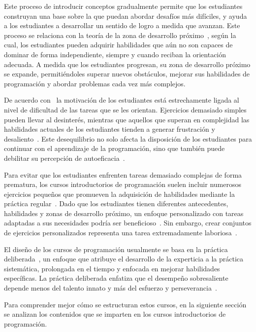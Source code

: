 Este proceso de introducir conceptos gradualmente permite que los estudiantes construyan una base sobre la que puedan abordar desafíos más difíciles, y ayuda a los estudiantes a desarrollar un sentido de logro a medida que avanzan. Este proceso se relaciona con la teoría de la zona de desarrollo próximo~\cite{vygotsky1978mind}, según la cual, los estudiantes pueden adquirir habilidades que aún no son capaces de dominar de forma independiente, siempre y cuando reciban la orientación adecuada. A medida que los estudiantes progresan, su zona de desarrollo próximo se expande, permitiéndoles superar nuevos obstáculos, mejorar sus habilidades de programación y abordar problemas cada vez más complejos.

De acuerdo con~\cite{rosenzweig2019expectancy} la motivación de los estudiantes está estrechamente ligada al nivel de dificultad de las tareas que se les orientan. Ejercicios demasiado simples pueden llevar al desinterés, mientras que aquellos que superan en complejidad las habilidades actuales de los estudiantes tienden a generar frustración y desaliento~\cite{rosenzweig2019expectancy}. Este desequilibrio no solo afecta la disposición de los estudiantes para continuar con el aprendizaje de la programación, sino que también puede debilitar su percepción de autoeficacia~\cite{bandura1977self}.

Para evitar que los estudiantes enfrenten tareas demasiado complejas de forma prematura, los cursos introductorios de programación suelen incluir numerosos ejercicios pequeños que promueven la adquisición de habilidades mediante la práctica regular~\cite{allen2018msp, vihavainen2011extreme}. Dado que los estudiantes tienen diferentes antecedentes, habilidades y zonas de desarrollo próximo, un enfoque personalizado con tareas adaptadas a sus necesidades podría ser beneficioso~\cite{leinonen2021exploring}. Sin embargo, crear conjuntos de ejercicios personalizados representa una tarea extremadamente laboriosa~\cite{lobb2016coderunner, wrenn2018whotests}.

El diseño de los cursos de programación usualmente se basa en la práctica deliberada~\cite{ericsson1993deliberate}, un enfoque que atribuye el desarrollo de la experticia a la práctica sistemática, prolongada en el tiempo y enfocada en mejorar habilidades específicas. La práctica deliberada enfatiza que el desempeño sobresaliente depende menos del talento innato y más del esfuerzo y perseverancia~\cite{duckworth2013true}.

Para comprender mejor cómo se estructuran estos cursos, en la siguiente sección se analizan los contenidos que se imparten en los cursos introductorios de programación.


